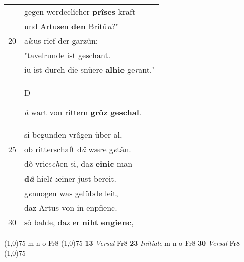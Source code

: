 \documentclass[8pt,a4paper,notitlepage]{article}
\begin{document}
\begin{table}[ht]
\begin{minipage}[t]{0.5\linewidth}
\begin{tabular}{rl}
 & gegen werdeclîcher \textbf{prîses} kraft\\ 
 & und Artusen \textbf{den} Britû\textit{n}?"\\ 
20 & a\textit{l}sus rief der garzûn:\\ 
 & "tavelrunde ist geschant.\\ 
 & iu ist durch die snüere \textbf{alhie} ge\textit{r}ant."\\ 
 & \begin{large}D\end{large}\textit{â} wart von rittern \textbf{grôz} \textbf{geschal}.\\ 
 & si begunden vrâgen über al,\\ 
25 & ob ritterschaft d\textit{â} wære g\textit{e}tân.\\ 
 & dô vries\textit{ch}en si, daz \textbf{einic} man\\ 
 & \textbf{d\textit{â}} hiel\textit{t} \textit{z}einer just bereit.\\ 
 & g\textit{e}nuogen was gelübde leit,\\ 
 & daz Artus von in enpfienc.\\ 
30 & sô balde, daz er \textbf{niht} \textbf{engienc},\\ 
\end{tabular}
\scriptsize
\line(1,0){75} \newline
m n o Fr8 \newline
\line(1,0){75} \newline
\textbf{13} \textit{Versal} Fr8  \textbf{23} \textit{Initiale} m n o Fr8  \textbf{30} \textit{Versal} Fr8  \newline
\line(1,0){75} \newline

\end{minipage}
\end{table}
\end{document}
